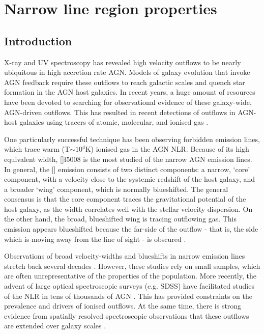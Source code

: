 
\chapter{Narrow line region properties}
\label{ch:nlr} 

\section{Introduction}

X-ray and UV spectroscopy has revealed high velocity outflows to be nearly ubiquitous in high accretion rate AGN.
Models of galaxy evolution that invoke AGN feedback require these outflows to reach galactic scales and quench star formation in the AGN host galaxies. 
In recent years, a huge amount of resources have been devoted to searching for observational evidence of these galaxy-wide, AGN-driven outflows. 
This has resulted in recent detections of outflows in AGN-host galaxies using tracers of atomic, molecular, and ionised gas \citep[e.g.][]{nesvadba06,arav08,nesvadba08,moe09,dunn10,alexander10,harrison12,harrison14,nesvadba10,rupke13,veilleux13,nardini15,feruglio10,alatalo11,cimatti13,cicone14}.  

One particularly successful technique has been observing forbidden emission lines, which trace warm (T$\sim$$10^4$K) ionised gas in the AGN NLR. 
Because of its high equivalent width, []\l5008 is the most studied of the narrow AGN emission lines. 
In general, the [] emission consists of two distinct components: a narrow, `core' component, with a velocity close to the systemic redshift of the host galaxy, and a broader `wing' component, which is normally blueshifted. 
The general consensus is that the core component traces the gravitational potential of the host galaxy, as the width correlates well with the stellar velocity dispersion. 
On the other hand, the broad, blueshifted wing is tracing outflowing gas. 
This emission appears blueshifted because the far-side of the outflow - that is, the side which is moving away from the line of sight - is obscured \citep[e.g.][]{heckman81,vrtilek85}. 

Observations of broad velocity-widths and blueshifts in narrow emission lines stretch back several decades \citep[e.g.][]{weedman70,stockton76,heckman81,veron81,feldman82,heckman84,vrtilek85,whittle85,boroson92}. 
However, these studies rely on small samples, which are often unrepresentative of the properties of the population. 
More recently, the advent of large optical spectroscopic surveys (e.g. SDSS) have facilitated studies of the NLR in tens of thousands of AGN \citep[e.g.][]{boroson05,greene05a,zhang11,mullaney13,zakamska14,shen14}. 
This has provided constraints on the prevalence and drivers of ionised outflows.   
At the same time, there is strong evidence from spatially resolved spectroscopic observations that these outflows are extended over galaxy scales \citep[e.g.][]{greene09,greene11,hainline13,harrison12,harrison14}. 

